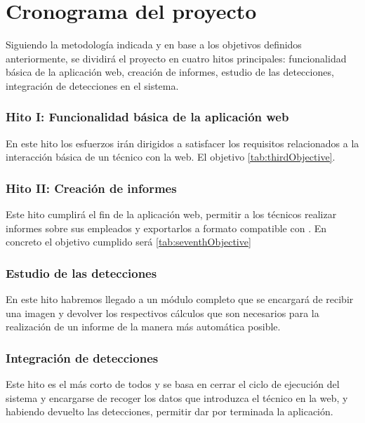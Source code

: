 \section{Cronograma del proyecto}
\label{sec:projectSchedule}

Siguiendo la metodología indicada y en base a los objetivos definidos anteriormente, se dividirá el proyecto en cuatro hitos principales: funcionalidad básica de la aplicación web, creación de informes, estudio de las detecciones, integración de detecciones en el sistema. 
\subsubsection{Hito I: Funcionalidad básica de la aplicación web}
En este hito los esfuerzos irán dirigidos a satisfacer los requisitos relacionados a la interacción básica de un técnico con la web. El objetivo \ref{tab:thirdObjective}.

\subsubsection{Hito II: Creación de informes}
Este hito cumplirá el fin de la aplicación web, permitir a los técnicos realizar informes sobre sus empleados y exportarlos a formato compatible con . En concreto el objetivo cumplido será \ref{tab:seventhObjective}

\subsubsection{Estudio de las detecciones}
En este hito habremos llegado a un módulo completo que se encargará de recibir una imagen y devolver los respectivos cálculos que son necesarios para la realización de un informe de la manera más automática posible.

\subsubsection{Integración de detecciones}
Este hito es el más corto de todos y se basa en cerrar el ciclo de ejecución del sistema y encargarse de recoger los datos que introduzca el técnico en la web, y habiendo devuelto las detecciones, permitir dar por terminada la aplicación.